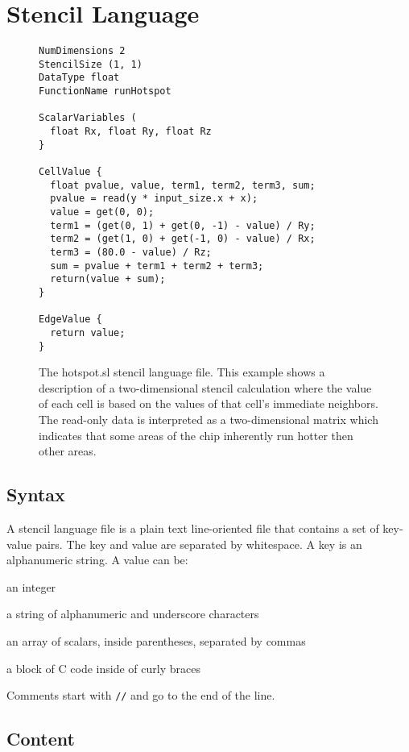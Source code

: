\documentclass{styles/sig-alternate}
\begin{document}
\section{Stencil Language}

\begin{figure}
\begin{small}
\begin{verbatim}
NumDimensions 2
StencilSize (1, 1)
DataType float
FunctionName runHotspot

ScalarVariables (
  float Rx, float Ry, float Rz
}

CellValue {
  float pvalue, value, term1, term2, term3, sum;
  pvalue = read(y * input_size.x + x);
  value = get(0, 0);
  term1 = (get(0, 1) + get(0, -1) - value) / Ry;
  term2 = (get(1, 0) + get(-1, 0) - value) / Rx;
  term3 = (80.0 - value) / Rz;
  sum = pvalue + term1 + term2 + term3;
  return(value + sum);
}

EdgeValue {
  return value;
}
\end{verbatim}
\end{small}
\caption{The hotspot.sl stencil language file.  This example
  shows a description of a two-dimensional stencil calculation where
  the value of each cell is based on the values of that cell's
  immediate neighbors.  The read-only data is interpreted as a
  two-dimensional matrix which indicates that some areas of the chip
  inherently run hotter then other areas.}
\label{fig:hotspot} 
\end{figure}

\subsection{Syntax}

A stencil language file is a plain text line-oriented file that
contains a set of key-value pairs.  The key and value are separated by
whitespace.  A key is an alphanumeric string.  A value can be:
\begin{itemize*}
\item an integer
\item a string of alphanumeric and underscore characters
\item an array of scalars, inside parentheses, separated by commas
\item a block of C code inside of curly braces
\end{itemize*}
Comments start with {\tt //} and go to the end of the line.

\subsection{Content}
\end{document}
